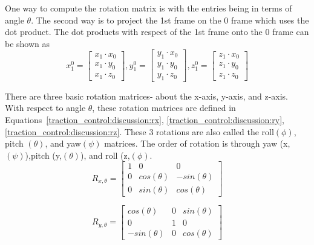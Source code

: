 One way to compute the rotation matrix is with the entries being in terms of angle $\theta$. The second way is to project the 1st frame on the 0 frame which uses the dot product.  The dot products with respect of the 1st frame onto the 0 frame can be shown as
\begin{equation}
	x^{0}_{1} = \left[\begin{array}{c}
				x_{1}\cdot x_{0} \\
			    x_{1}\cdot y_{0} \\
			    x_{1}\cdot z_{0}
				\end{array} \right],
	y^{0}_{1} = \left[\begin{array}{c}
				y_{1}\cdot x_{0} \\
				y_{1}\cdot y_{0} \\
				y_{1}\cdot z_{0}
	\end{array} \right],
	z^{0}_{1} = \left[\begin{array}{c}
				z_{1}\cdot x_{0} \\
				z_{1}\cdot y_{0} \\
				z_{1}\cdot z_{0}
	\end{array} \right]
\end{equation}

There are three basic rotation matrices- about the x-axis, y-axis, and z-axis. With respect to angle $\theta$, these rotation matrices are defined in
Equations~\ref{traction_control:discussion:rx}, \ref{traction_control:discussion:ry}, \ref{traction_control:discussion:rz}. 
These 3 rotations are also called the roll$(\phi)$, pitch $(\theta)$, and yaw$(\psi)$ matrices. The order of rotation is through yaw (x,$(\psi)$),pitch (y,$(\theta)$), and roll (z,$(\phi)$. \\

\begin{equation}
	R_{x,\theta} = \left[\begin{array}{ccc}
				1 & 0 & 0 \\
				0 & cos(\theta) & -sin(\theta)  \\
				0 & sin(\theta) & cos(\theta) 
				\end{array}\right]
	\label{traction_control:discussion:rx}
\end{equation}

\begin{equation}
	R_{y,\theta} = \left[\begin{array}{ccc}
		cos(\theta) & 0 & sin(\theta) \\
		0 & 1 & 0 \\
		-sin(\theta) & 0 & cos(\theta) 
	\end{array}\right]
	\label{traction_control:discussion:ry}
\end{equation}

